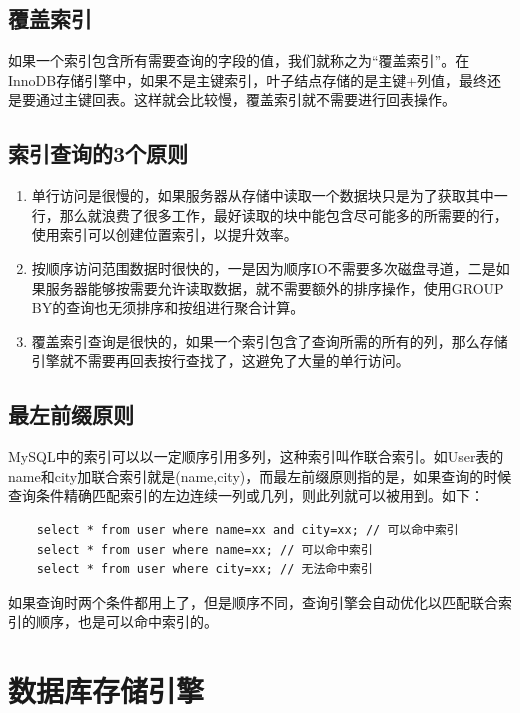 \subsection{覆盖索引}
如果一个索引包含所有需要查询的字段的值，我们就称之为“覆盖索引”。在InnoDB存储引擎中，如果不是主键索引，叶子结点存储的是主键+列值，最终还是要通过主键回表。这样就会比较慢，覆盖索引就不需要进行回表操作。

\subsection{索引查询的3个原则}
\begin{enumerate}
    \item 单行访问是很慢的，如果服务器从存储中读取一个数据块只是为了获取其中一行，那么就浪费了很多工作，最好读取的块中能包含尽可能多的所需要的行，使用索引可以创建位置索引，以提升效率。
    \item 按顺序访问范围数据时很快的，一是因为顺序IO不需要多次磁盘寻道，二是如果服务器能够按需要允许读取数据，就不需要额外的排序操作，使用GROUP BY的查询也无须排序和按组进行聚合计算。
    \item 覆盖索引查询是很快的，如果一个索引包含了查询所需的所有的列，那么存储引擎就不需要再回表按行查找了，这避免了大量的单行访问。
\end{enumerate}

\subsection{最左前缀原则}
MySQL中的索引可以以一定顺序引用多列，这种索引叫作联合索引。如User表的name和city加联合索引就是(name,city)，而最左前缀原则指的是，如果查询的时候查询条件精确匹配索引的左边连续一列或几列，则此列就可以被用到。如下：
\begin{verbatim}
    select * from user where name=xx and city=xx; // 可以命中索引
    select * from user where name=xx; // 可以命中索引
    select * from user where city=xx; // 无法命中索引
\end{verbatim}
如果查询时两个条件都用上了，但是顺序不同，查询引擎会自动优化以匹配联合索引的顺序，也是可以命中索引的。

\section{数据库存储引擎}
